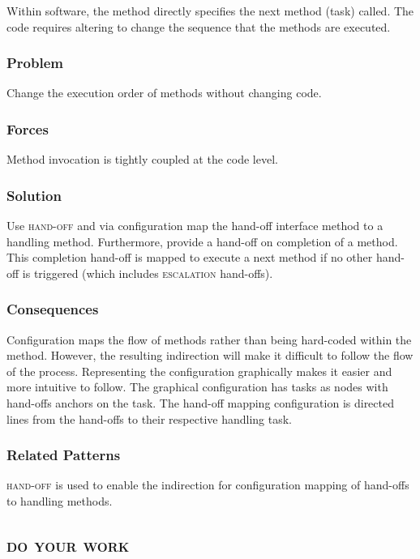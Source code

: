 \documentclass[prodmode]{style/acmlarge}
\begin{document}
Within software, the method directly specifies the next method (task) called. 
The code requires altering to change the sequence that the methods are executed.

\subsubsection*{Problem} Change the execution order of methods without changing
code.

\subsubsection*{Forces} Method invocation is tightly coupled at the code level.

\subsubsection*{Solution} Use \textsc{hand-off} and via configuration map the
hand-off interface method to a handling method.  Furthermore, provide a hand-off
on completion of a method.  This completion hand-off is mapped to execute a next
method if no other hand-off is triggered (which includes \textsc{escalation}
hand-offs).

\subsubsection*{Consequences} Configuration maps the flow of methods rather than
being hard-coded within the method.  However, the resulting indirection will
make it difficult to follow the flow of the process.  Representing the
configuration graphically makes it easier and more intuitive to follow.  The
graphical configuration has tasks as nodes with hand-offs anchors on the task. 
The hand-off mapping configuration is directed lines from the hand-offs to their
respective handling task.

\subsubsection*{Related Patterns} \textsc{hand-off} is used to enable the
indirection for configuration mapping of hand-offs to handling methods.




\subsection{\textsc{\textbf{do your work}}}
\end{document}
